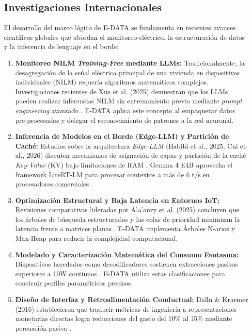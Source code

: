 \documentclass[10pt,journal,compsoc]{IEEEtran}
\begin{document}
\subsection{Investigaciones Internacionales}
El desarrollo del marco lógico de E-DATA se fundamenta en recientes avances científicos globales que abordan el monitoreo eléctrico, la estructuración de datos y la inferencia de lenguaje en el borde:
\begin{enumerate}
\item \textbf{Monitoreo NILM \emph{Training-Free} mediante LLMs:} Tradicionalmente, la desagregación de la señal eléctrica principal de una vivienda en dispositivos individuales (NILM) requería algoritmos matemáticos complejos. Investigaciones recientes de Xue et al. (2025) demuestran que los LLMs pueden realizar inferencias NILM sin entrenamiento previo mediante \emph{prompt engineering} avanzado \cite{xue2025}. E-DATA aplica este concepto al empaquetar datos pre-procesados y delegar el reconocimiento de patrones a la red neuronal.
\item \textbf{Inferencia de Modelos en el Borde (Edge-LLM) y Partición de Caché:} Estudios sobre la arquitectura \emph{Edge-LLM} (Habibi et al., 2025; Cui et al., 2026) discuten mecanismos de asignación de capas y partición de la caché \emph{Key-Value} (KV) bajo limitaciones de RAM \cite{habibi2025,cui2026}. Gemma 4 E4B aprovecha el framework LiteRT-LM para procesar contextos a más de 6 t/s en procesadores comerciales \cite{hf2026}.
\item \textbf{Optimización Estructural y Baja Latencia en Entornos IoT:} Revisiones comparativas lideradas por Ala'anzy et al. (2025) concluyen que los árboles de búsqueda estructurados y las colas de prioridad minimizan la latencia frente a matrices planas \cite{alaanzy2025}. E-DATA implementa Árboles N-arios y Max-Heap para reducir la complejidad computacional.
\item \textbf{Modelado y Caracterización Matemática del Consumo Fantasma:} Dispositivos heredados como decodificadores sostienen extracciones pasivas superiores a 10W continuos \cite{dalln2016}. E-DATA utiliza estas clasificaciones para construir perfiles paramétricos precisos.
\item \textbf{Diseño de Interfaz y Retroalimentación Conductual:} Dalln \& Kraemer (2016) establecieron que traducir métricas de ingeniería a representaciones monetarias directas logra reducciones del gasto del 10\% al 15\% mediante persuasión pasiva \cite{dalln2016}.
\end{enumerate}
\end{document}
